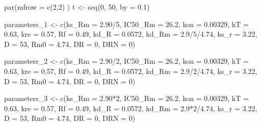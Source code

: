 \documentclass[
]{article}
\newenvironment{Shaded}{\begin{snugshade}}{\end{snugshade}}
\newcommand{\AttributeTok}[1]{\textcolor[rgb]{0.77,0.63,0.00}{#1}}
\newcommand{\DecValTok}[1]{\textcolor[rgb]{0.00,0.00,0.81}{#1}}
\newcommand{\FloatTok}[1]{\textcolor[rgb]{0.00,0.00,0.81}{#1}}
\newcommand{\FunctionTok}[1]{\textcolor[rgb]{0.00,0.00,0.00}{#1}}
\newcommand{\NormalTok}[1]{#1}
\newcommand{\OtherTok}[1]{\textcolor[rgb]{0.56,0.35,0.01}{#1}}
\newcommand{\SpecialCharTok}[1]{\textcolor[rgb]{0.00,0.00,0.00}{#1}}
\begin{document}
\begin{Shaded}
\begin{Highlighting}[]
\FunctionTok{par}\NormalTok{(}\AttributeTok{mfrow =} \FunctionTok{c}\NormalTok{(}\DecValTok{2}\NormalTok{,}\DecValTok{2}\NormalTok{) )}
\NormalTok{t }\OtherTok{\textless{}{-}} \FunctionTok{seq}\NormalTok{(}\DecValTok{0}\NormalTok{, }\DecValTok{50}\NormalTok{, }\AttributeTok{by =} \FloatTok{0.1}\NormalTok{)}

\NormalTok{parameters\_1 }\OtherTok{\textless{}{-}} \FunctionTok{c}\NormalTok{(}\AttributeTok{ks\_Rm =} \FloatTok{2.90}\SpecialCharTok{/}\DecValTok{5}\NormalTok{, }\AttributeTok{IC50\_Rm =} \FloatTok{26.2}\NormalTok{, }\AttributeTok{kon =} \FloatTok{0.00329}\NormalTok{,}
                \AttributeTok{kT =} \FloatTok{0.63}\NormalTok{, }\AttributeTok{kre =} \FloatTok{0.57}\NormalTok{, }\AttributeTok{Rf =} \FloatTok{0.49}\NormalTok{, }\AttributeTok{kd\_R =} \FloatTok{0.0572}\NormalTok{,}
                \AttributeTok{kd\_Rm =} \FloatTok{2.9}\SpecialCharTok{/}\DecValTok{5}\SpecialCharTok{/}\FloatTok{4.74}\NormalTok{, }\AttributeTok{ks\_r =} \FloatTok{3.22}\NormalTok{, }\AttributeTok{D =} \DecValTok{53}\NormalTok{, }\AttributeTok{Rm0 =} \FloatTok{4.74}\NormalTok{,}
                \AttributeTok{DR =} \DecValTok{0}\NormalTok{, }\AttributeTok{DRN =} \DecValTok{0}\NormalTok{)}

\NormalTok{parameters\_2 }\OtherTok{\textless{}{-}} \FunctionTok{c}\NormalTok{(}\AttributeTok{ks\_Rm =} \FloatTok{2.90}\SpecialCharTok{/}\DecValTok{2}\NormalTok{, }\AttributeTok{IC50\_Rm =} \FloatTok{26.2}\NormalTok{, }\AttributeTok{kon =} \FloatTok{0.00329}\NormalTok{,}
                \AttributeTok{kT =} \FloatTok{0.63}\NormalTok{, }\AttributeTok{kre =} \FloatTok{0.57}\NormalTok{, }\AttributeTok{Rf =} \FloatTok{0.49}\NormalTok{, }\AttributeTok{kd\_R =} \FloatTok{0.0572}\NormalTok{,}
                \AttributeTok{kd\_Rm =} \FloatTok{2.9}\SpecialCharTok{/}\DecValTok{2}\SpecialCharTok{/}\FloatTok{4.74}\NormalTok{, }\AttributeTok{ks\_r =} \FloatTok{3.22}\NormalTok{, }\AttributeTok{D =} \DecValTok{53}\NormalTok{, }\AttributeTok{Rm0 =} \FloatTok{4.74}\NormalTok{,}
                \AttributeTok{DR =} \DecValTok{0}\NormalTok{, }\AttributeTok{DRN =} \DecValTok{0}\NormalTok{)}

\NormalTok{parameters\_3 }\OtherTok{\textless{}{-}} \FunctionTok{c}\NormalTok{(}\AttributeTok{ks\_Rm =} \FloatTok{2.90}\SpecialCharTok{*}\DecValTok{2}\NormalTok{, }\AttributeTok{IC50\_Rm =} \FloatTok{26.2}\NormalTok{, }\AttributeTok{kon =} \FloatTok{0.00329}\NormalTok{,}
                \AttributeTok{kT =} \FloatTok{0.63}\NormalTok{, }\AttributeTok{kre =} \FloatTok{0.57}\NormalTok{, }\AttributeTok{Rf =} \FloatTok{0.49}\NormalTok{, }\AttributeTok{kd\_R =} \FloatTok{0.0572}\NormalTok{,}
                \AttributeTok{kd\_Rm =} \FloatTok{2.9}\SpecialCharTok{*}\DecValTok{2}\SpecialCharTok{/}\FloatTok{4.74}\NormalTok{, }\AttributeTok{ks\_r =} \FloatTok{3.22}\NormalTok{, }\AttributeTok{D =} \DecValTok{53}\NormalTok{, }\AttributeTok{Rm0 =} \FloatTok{4.74}\NormalTok{,}
                \AttributeTok{DR =} \DecValTok{0}\NormalTok{, }\AttributeTok{DRN =} \DecValTok{0}\NormalTok{)}


\end{Highlighting}
\end{Shaded}
\end{document}
